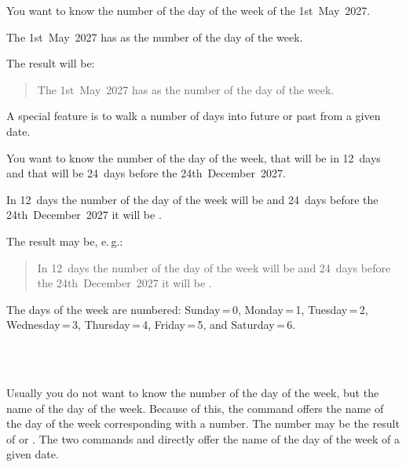 \begin{Example}
  You want to know the number of the day of the week of the 1st~May~2027.
\begin{lstcode}
  The 1st~May~2027 has \the{}
  as the number of the day of the week.
\end{lstcode}
  The result will be:
  \begin{quote}
    The 1st~May~2027 has \the{}
    as the number of the day of the week.
  \end{quote}
\end{Example}

A special feature is to walk a number of days into future or past from a given
date.
\begin{Example}
  You want to know the number of the day of the week, that will be in 12~days
  and that will be 24~days before the 24th~December~2027.
\begin{lstcode}
  In 12~days the number of the day of the week
  will be \the{} and
  24~days before the 24th~December~2027 it will be
  \the{}.
\end{lstcode}
  The result may be, e.\,g.:
  \begin{quote}
    In 12~days the number of the day of the week
    will be \the{} and
    24~days before the 24th~December~2027 it will be
    \the{}.
  \end{quote}
\end{Example}

The days of the week are numbered: Sunday\,=\,0, Monday\,=\,1, Tuesday\,=\,2,
Wednesday\,=\,3, Thursday\,=\,4, Friday\,=\,5, and Saturday\,=\,6.%
%
%
%


\begin{Declaration}
  \\%
  \\%
\end{Declaration}%
%
%
%
Usually you do not want to know the number
of the day of the week, but the name of the day of the week. Because of this,
the command  offers the name of the day of the week
corresponding with a number. The number may be the result of 
or . The two commands  and
 directly offer the name of the day of the week of a given
date.

